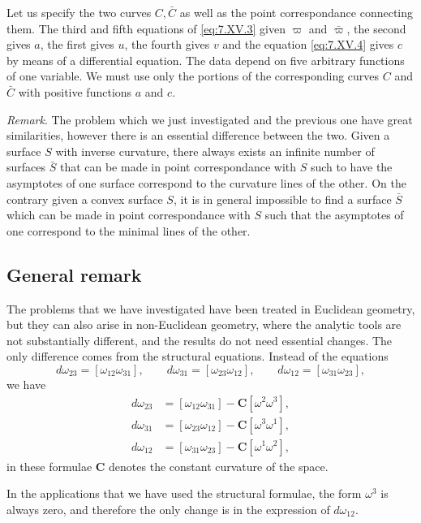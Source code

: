 \documentclass[leqno,11pt]{book}
\numberwithin{equation}{chapter}
\theoremstyle{shape1}
\theoremstyle{shape0}
\theoremstyle{shape2}
\theoremstyle{definition}
\begin{document}
Let us specify the two curves $C, \bar C$ as well as the point correspondance connecting them. The third and fifth equations of \eqref{eq:7.XV.3} given $\varpi$ and $\bar\varpi$, the second gives $a$, the first gives $u$, the fourth gives $v$ and the equation \eqref{eq:7.XV.4} gives $c$ by means of a differential equation. The data depend on five arbitrary functions of one variable. We must use only the portions of the corresponding curves $C$ and $\bar C$ with positive functions $a$ and $c$.


\vspace{12pt}\fsec \emph{Remark}. The problem which we just investigated and the previous one have great similarities, however there is an essential difference between the two. Given a surface $S$ with inverse curvature, there always exists an infinite number of surfaces $\bar S$ that can be made in point correspondance with $S$ such to have the asymptotes of one surface correspond to the curvature lines of the other. On the contrary given a convex surface $S$, it is in general impossible to find a surface $\bar S$ which can be made in point correspondance with $S$ such that the asymptotes of one correspond to the minimal lines of the other.

\subsection*{General remark}
\label{sec:general-remark}

\fsec The problems that we have investigated have been treated in Euclidean geometry, but they can also arise in non-Euclidean geometry, where the analytic tools are not substantially different, and the results do not need essential changes. The only difference comes from the structural equations. Instead of the equations
\[
d\omega_{23}=[\omega_{12}\omega_{31}],\qquad d\omega_{31}=[\omega_{23}\omega_{12}],\qquad d\omega_{12}=[\omega_{31}\omega_{23}],
\]
we have
\begin{align*}
  d\omega_{23}&=[\omega_{12}\omega_{31}]-\mathbf{C}[\omega^{2}\omega^{3}],\\
  d\omega_{31}&=[\omega_{23}\omega_{12}]-\mathbf{C}[\omega^{3}\omega^{1}],\\
  d\omega_{12}&=[\omega_{31}\omega_{23}]-\mathbf{C}[\omega^{1}\omega^{2}],
\end{align*}
in these formulae $\mathbf{C}$ denotes the constant curvature of the space.

In the applications that we have used the structural formulae, the form $\omega^{3}$ is always zero, and therefore the only change is in the expression of $d\omega_{12}$.
\end{document}
